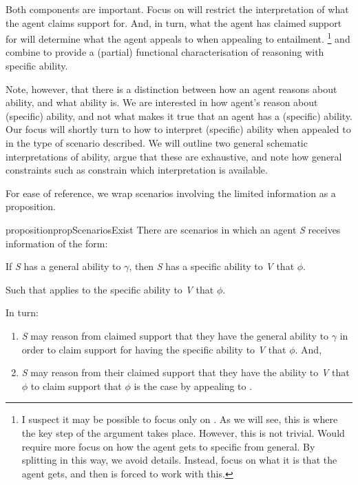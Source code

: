 \begin{note}
  Both components are important.
  Focus on \gsi{} will restrict the interpretation of what the agent claims support for.
  And, in turn, what the agent has claimed support for will determine what the agent appeals to when appealing to  entailment.\nolinebreak
  \footnote{
    I suspect it may be possible to focus only on \gsi{}.
    As we will see, this is where the key step of the argument takes place.
    However, this is not trivial.
    Would require more focus on how the agent gets to specific from general.
    By splitting in this way, we avoid details.
    Instead, focus on what it is that the agent gets, and then  is forced to work with this.
  }
  \gsi{} and  combine to provide a (partial) functional characterisation of reasoning with specific ability.
\end{note}

\begin{note}
  Note, however, that there is a distinction between how an agent reasons about ability, and what ability is.
  We are interested in how agent's reason about (specific) ability, and not what makes it true that an agent has a (specific) ability.
  Our focus will shortly turn to how to interpret (specific) ability when appealed to in the type of scenario described.
  We will outline two general schematic interpretations of ability, argue that these are exhaustive, and note how general constraints such as \ESU{} constrain which interpretation is available.
\end{note}

\begin{note}
  For ease of reference, we wrap scenarios involving the limited information as a proposition.
    \begin{restatable}[\eA{0} --- \eA{}]{proposition}{propScenariosExist}\label{prop:SE}
    There are scenarios in which an agent \emph{S} receives \gsi{} information of the form:
    \begin{center}
      If \emph{S} has a general ability to \(\gamma\), then \emph{S} has a specific ability to \emph{V} that \(\phi\).
    \end{center}

    \noindent Such that  applies to the specific ability to \emph{V} that \(\phi\).

    In turn:
    \begin{enumerate}
    \item \emph{S} may reason from claimed support that they have the general ability to \(\gamma\) in order to claim support for having the specific ability to \emph{V} that \(\phi\). And,
    \item \emph{S} may reason from their claimed support that they have the ability to \emph{V} that \(\phi\) to claim support that \(\phi\) is the case by appealing to .
    \end{enumerate}
    \vspace{-\baselineskip}
  \end{restatable}
\end{note}

